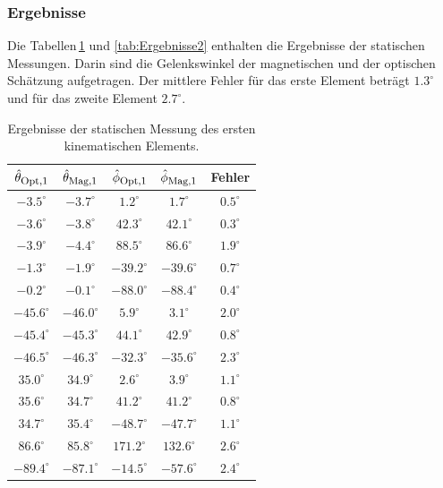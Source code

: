 \subsubsection{Ergebnisse}
Die Tabellen\,\ref{tab:Ergebnisse1} und \ref{tab:Ergebnisse2} enthalten die Ergebnisse der statischen Messungen. Darin sind die Gelenkswinkel der magnetischen und der optischen Schätzung aufgetragen. Der mittlere Fehler für das erste Element beträgt $1.3^\circ$ und für das zweite Element $2.7^\circ$.

\begin{table}[h]
    \centering
    \begin{tabular}{|c| c| c| c| c|}
    \hline 
    \rowcolor{gray}$\hat{\theta}_{\textrm{\footnotesize{Opt,1}}}$ & $\hat{\theta}_{\textrm{\footnotesize{Mag,1}}}$ & $\hat{\phi}_{\textrm{\footnotesize{Opt,1}}}$ & $\hat{\phi}_{\textrm{\footnotesize{Mag,1}}}$ & Fehler \\ 
     \hline
     $-3.5^\circ$ & $-3.7^\circ$ & $1.2^\circ$  & $1.7^\circ$ & $0.5^\circ$ \\ 
     \hline
     \rowcolor{lightgray}$-3.6^\circ$ & $-3.8^\circ$ & $42.3^\circ$   & $42.1^\circ$ & $0.3^\circ$ \\
     \hline
     $-3.9^\circ$ & $-4.4^\circ$ & $88.5^\circ$  & $86.6^\circ$ & $1.9^\circ$ \\
     \hline
     \rowcolor{lightgray}$-1.3^\circ$ & $-1.9^\circ$ & $-39.2^\circ$ & $-39.6^\circ$ & $0.7^\circ$ \\
     \hline
     $-0.2^\circ$ & $-0.1^\circ$ & $-88.0^\circ$ & $-88.4^\circ$ & $0.4^\circ$ \\ 
     \hline
     \rowcolor{lightgray}$-45.6^\circ$ & $-46.0^\circ$ & $5.9^\circ$ & $3.1^\circ$ & $2.0^\circ$  \\ 
     \hline
     $-45.4^\circ$ & $-45.3^\circ$ & $44.1^\circ$  & $42.9^\circ$ & $0.8^\circ$ \\
     \hline
     \rowcolor{lightgray}$-46.5^\circ$ & $-46.3^\circ$ & $-32.3^\circ$ & $-35.6^\circ$ & $2.3^\circ$ \\
     \hline
     $35.0^\circ$ & $34.9^\circ$ & $2.6^\circ$ & $3.9^\circ$ & $1.1^\circ$ \\
     \hline
     \rowcolor{lightgray}$35.6^\circ$ & $34.7^\circ$ & $41.2^\circ$  & $41.2^\circ$ & $0.8^\circ$ \\ 
     \hline
     $34.7^\circ$ & $35.4^\circ$ & $-48.7^\circ$  & $-47.7^\circ$ & $1.1^\circ $ \\ 
     \hline
     \rowcolor{lightgray}$86.6^\circ$ & $85.8^\circ$ & $171.2^\circ$ & $132.6^\circ$ & $2.6^\circ$ \\
     \hline
     $-89.4^\circ$ & $-87.1^\circ$ & $-14.5^\circ$ & $-57.6^\circ$ & $2.4^\circ$ \\
     \hline
    \end{tabular}
    \caption{Ergebnisse der statischen Messung des ersten kinematischen Elements.}
    \label{tab:Ergebnisse1}
  \end{table}

